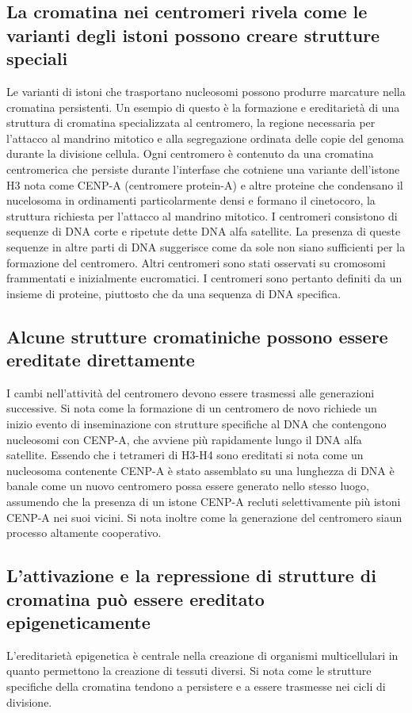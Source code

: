 \subsection{La cromatina nei centromeri rivela come le varianti degli istoni possono creare strutture speciali}
Le varianti di istoni che trasportano nucleosomi possono produrre marcature nella cromatina persistenti. Un esempio di questo \`e la formazione e ereditariet\`a di una struttura di 
cromatina specializzata al centromero, la regione necessaria per l'attacco al mandrino mitotico e alla segregazione ordinata delle copie del genoma durante la divisione cellula. Ogni
centromero \`e contenuto da una cromatina centromerica che persiste durante l'interfase che cotniene una variante dell'istone H3 nota come CENP-A (centromere protein-A) e altre 
proteine che condensano il nucelosoma in ordinamenti particolarmente densi e formano il cinetocoro, la struttura richiesta per l'attacco al mandrino mitotico. I centromeri consistono 
di sequenze di DNA corte e ripetute dette DNA alfa satellite. La presenza di queste sequenze in altre parti di DNA suggerisce come da sole non siano sufficienti per la formazione 
del centromero. Altri centromeri sono stati osservati su cromosomi frammentati e inizialmente eucromatici. I centromeri sono pertanto definiti da un insieme di proteine, piuttosto che
da una sequenza di DNA specifica. 
\subsection{Alcune strutture cromatiniche possono essere ereditate direttamente}
I cambi nell'attivit\`a del centromero devono essere trasmessi alle generazioni successive. Si nota come la formazione di un centromero de novo richiede un inizio evento di 
inseminazione con strutture specifiche al DNA che contengono nucleosomi con CENP-A, che avviene pi\`u rapidamente lungo il DNA alfa satellite. Essendo che i tetrameri di H3-H4 sono
ereditati si nota come un nucleosoma contenente CENP-A \`e stato assemblato su una lunghezza di DNA \`e banale come un nuovo centromero possa essere generato nello stesso luogo, 
assumendo che la presenza di un istone CENP-A recluti selettivamente pi\`u istoni CENP-A nei suoi vicini. Si nota inoltre come la generazione del centromero siaun processo altamente 
cooperativo.
\subsection{L'attivazione e la repressione di strutture di cromatina pu\`o essere ereditato epigeneticamente}
L'ereditariet\`a epigenetica \`e centrale nella creazione di organismi multicellulari in quanto permettono la creazione di tessuti diversi. Si nota come le strutture specifiche della
cromatina tendono a persistere e a essere trasmesse nei cicli di divisione.
